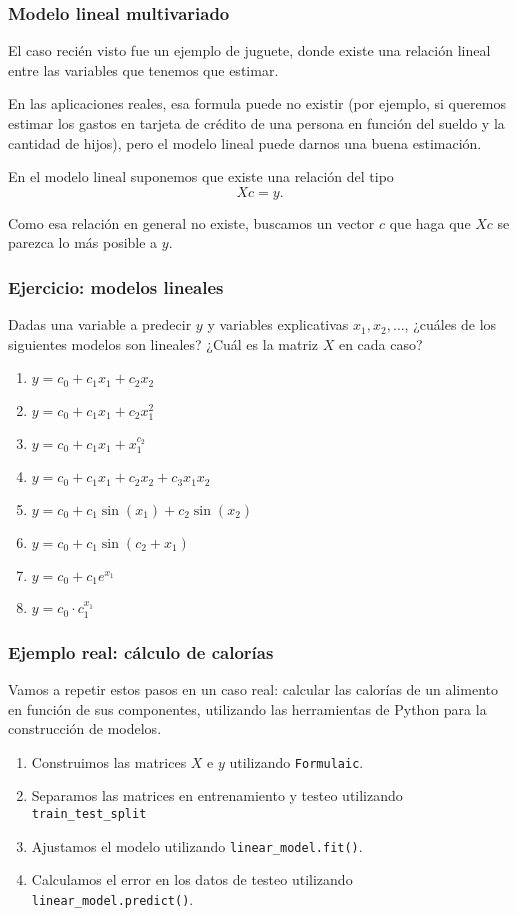 \documentclass[aspectratio=169,12pt]{beamer}
\begin{document}
\begin{frame}
\frametitle{Modelo lineal multivariado}

El caso recién visto fue un ejemplo de juguete, donde existe una relación lineal entre las variables que tenemos que estimar.

En las aplicaciones reales, esa formula puede no existir (por ejemplo, si queremos estimar los gastos en tarjeta de crédito de una persona en función del sueldo y la cantidad de hijos), pero el modelo lineal puede darnos una buena estimación.

En el modelo lineal suponemos que existe una relación del tipo
$$ X c = y.$$

Como esa relación en general no existe, buscamos un vector $c$ que haga que $X c$ se parezca lo más posible a $y$.

\end{frame}


\begin{frame}
\frametitle{Ejercicio: modelos lineales}

Dadas una variable a predecir $y$ y variables explicativas $x_1, x_2, \dots$, ¿cuáles de los siguientes modelos son lineales? ¿Cuál es la matriz $X$ en cada caso?

\begin{enumerate}
\item $y = c_0 + c_1 x_1 + c_2 x_2$
\item $y = c_0 + c_1 x_1 + c_2 x_1^2$
\item $y = c_0 + c_1 x_1 + x_1^{c_2}$
\item $y = c_0 + c_1 x_1 + c_2 x_2 + c_3 x_1 x_2$
\item $y = c_0 + c_1 \sin(x_1) + c_2 \sin(x_2)$
\item $y = c_0 + c_1 \sin(c_2 + x_1)$
\item $y = c_0 + c_1 e^{x_1}$
\item $y = c_0 \cdot c_1 ^{x_1}$
\end{enumerate}

\end{frame}

\begin{frame}
\frametitle{Ejemplo real: cálculo de calorías}

Vamos a repetir estos pasos en un caso real: calcular las calorías de un alimento en función de sus componentes, utilizando las herramientas de Python para la construcción de modelos.
\begin{enumerate}
\item Construimos las matrices $X$ e $y$ utilizando \lstinline{Formulaic}.
\item Separamos las matrices en entrenamiento y testeo utilizando \lstinline{train_test_split}
\item Ajustamos el modelo utilizando \lstinline{linear_model.fit()}.
\item Calculamos el error en los datos de testeo utilizando \lstinline{linear_model.predict()}.
\end{enumerate}

\end{frame}
\end{document}
